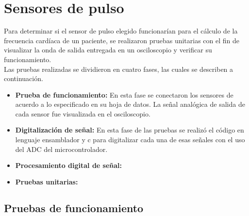 
\section{Sensores de pulso}

Para determinar si el sensor de pulso elegido funcionarían para el cálculo de la frecuencia cardíaca de un paciente, se realizaron pruebas unitarias con el fin de  visualizar la onda de salida entregada en un osciloscopio y verificar su funcionamiento.\\

Las pruebas realizadas se dividieron en cuatro fases, las cuales se describen a continuación.


\begin{itemize}
	\item \textbf{Prueba de funcionamiento:} En esta fase se conectaron los sensores de acuerdo a lo especificado en su hoja de datos. La señal analógica de salida de cada sensor fue visualizada en el osciloscopio.
	\item \textbf{Digitalización de señal:} En esta fase de las pruebas se realizó el código en lenguaje ensamblador y c para digitalizar cada una de esas señales con el uso del ADC del microcontrolador.
	\item \textbf{Procesamiento digital de señal:}
	\item \textbf{Pruebas unitarias:}
\end{itemize}

\subsection{Pruebas de funcionamiento}
%


